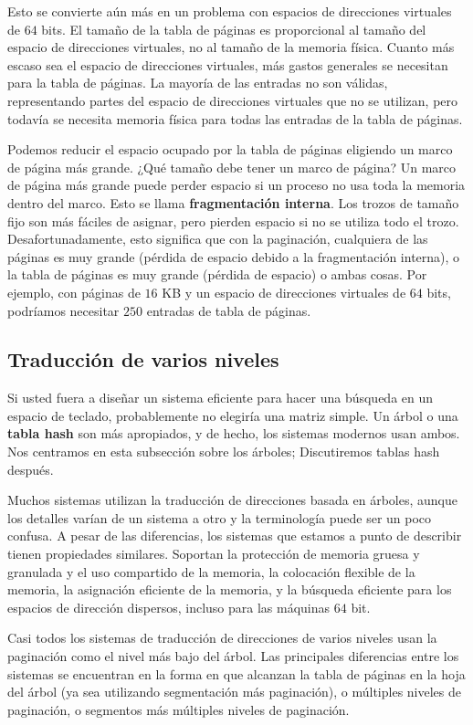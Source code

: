 \documentclass[10pt]{book}
\begin{document}
Esto se convierte aún más en un problema con espacios de direcciones virtuales de $64$ bits. El tamaño de la tabla de páginas es proporcional al tamaño del espacio de direcciones virtuales, no al tamaño de la memoria física. Cuanto más escaso sea el espacio de direcciones virtuales, más gastos generales se necesitan para la tabla de páginas. La mayoría de las entradas no son válidas, representando partes del espacio de direcciones virtuales que no se utilizan, pero todavía se necesita memoria física para todas las entradas de la tabla de páginas.

Podemos reducir el espacio ocupado por la tabla de páginas eligiendo un marco de página más grande. ¿Qué tamaño debe tener un marco de página? Un marco de página más grande puede perder espacio si un proceso no usa toda la memoria dentro del marco. Esto se llama \textbf{fragmentación interna}. Los trozos de tamaño fijo son más fáciles de asignar, pero pierden espacio si no se utiliza todo el trozo. Desafortunadamente, esto significa que con la paginación, cualquiera de las páginas es muy grande (pérdida de espacio debido a la fragmentación interna), o la tabla de páginas es muy grande (pérdida de espacio) o ambas cosas. Por ejemplo, con páginas de $16$ KB y un espacio de direcciones virtuales de $64$ bits, podríamos necesitar $250$ entradas de tabla de páginas.

\subsection{Traducción de varios niveles}
Si usted fuera a diseñar un sistema eficiente para hacer una búsqueda en un espacio de teclado, probablemente no elegiría una matriz simple. Un árbol o una \textbf{tabla hash} son más apropiados, y de hecho, los sistemas modernos usan ambos. Nos centramos en esta subsección sobre los árboles; Discutiremos tablas hash después.

Muchos sistemas utilizan la traducción de direcciones basada en árboles, aunque los detalles varían de un sistema a otro y la terminología puede ser un poco confusa. A pesar de las diferencias, los sistemas que estamos a punto de describir tienen propiedades similares. Soportan la protección de memoria gruesa y granulada y el uso compartido de la memoria, la colocación flexible de la memoria, la asignación eficiente de la memoria, y la búsqueda eficiente para los espacios de dirección dispersos, incluso para las máquinas $64$ bit.

Casi todos los sistemas de traducción de direcciones de varios niveles usan la paginación como el nivel más bajo del árbol. Las principales diferencias entre los sistemas se encuentran en la forma en que alcanzan la tabla de páginas en la hoja del árbol (ya sea utilizando segmentación más paginación), o múltiples niveles de paginación, o segmentos más múltiples niveles de paginación. 
\end{document}
